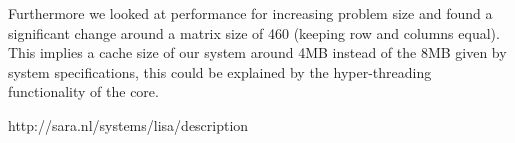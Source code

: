 \documentclass[11pt,a4paper,onecolumn]{article}
\begin{document}
Furthermore we looked at performance for increasing problem size and found a significant change around a matrix size of 460 (keeping row and columns equal). This implies a cache size of our system around 4MB instead of the 8MB given by system specifications, this could be explained by the hyper-threading functionality of the core.


\begin{thebibliography}{7}
  http://sara.nl/systems/lisa/description
\end{thebibliography}
\end{document}
